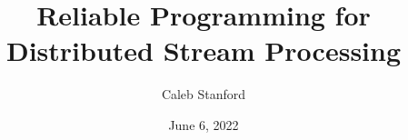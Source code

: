 \documentclass{article}
\title{\Large{} Reliable Programming for Distributed Stream Processing}
\author{Caleb Stanford}
\date{June 6, 2022}
\begin{document}
\maketitle{}



\tableofcontents{}

% 












\renewcommand{\refname}{Other References}


\end{document}
